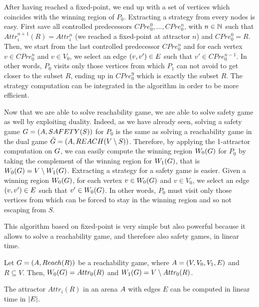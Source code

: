 After having reached a fixed-point, we end up with a set of vertices which coincides with the winning region of $P_0$. 
Extracting a strategy from every nodes is easy. 
First save all controlled predecessors $CPre_0^0,\dots,CPre_0^n$, with $n \in \mathbb{N}$ such that $Attr_i^{n+1}(R) = Attr_i^{n}$ (we reached a fixed-point at attractor $n$) and $CPre_0^0 = R$. Then, we start from the last controlled predecessor $CPre_0^n$ and for each vertex $v \in CPre_0^n$ and $ v \in V_0$, we select an edge $\left( v,v' \right) \in E$ such that $v' \in CPre_0^{n-1}$. 
In other words, $P_0$ visits only those vertices from which $P_1$ can not avoid to get closer to the subset $R$, ending up in $CPre_0^9$ which is exactly the subset $R$. 
The strategy computation can be integrated in the algorithm in order to be more efficient.

Now that we are able to solve reachability game, we are able to solve safety game as well by exploiting duality. 
Indeed, as we have already seen, solving a safety game $G = \left( A, SAFETY(S) \right)$ for $P_0$ is the same as solving a reachability game in the dual game $\bar{G} = \left( A, REACH(V \setminus S) \right)$. 
Therefore, by applying the 1-attractor computation on $G$, we can easily compute the winning region $W_0(G)$ for $P_0$ by taking the complement of the winning region for $W_1(G)$, that is $W_0(G) = V \setminus W_1(G)$.
Extracting a strategy for a safety game is easier.
Given a winning region $W_0(G)$, for each vertex $v \in W_0(G)$ and $v \in V_0$, we select an edge $\left( v,v' \right) \in E$ such that $v' \in W_0(G)$. In other words, $P_0$ must visit only those vertices from which can be forced to stay in the winning region and so not escaping from $S$.

This algorithm based on fixed-point is very simple but also powerful because it allows to solve a reachability game, and therefore also safety games, in linear time. 

\begin{lemma}
Let $G = (A, Reach(R))$ be a reachability game, where $A = \left( V, V_0, V_1, E \right)$ and $R \subseteq V$. Then, $W_0(G) = Attr_0(R)$ and $W_1(G) = V \setminus Attr_0(R)$.
\end{lemma}

\begin{lemma}
The attractor $Attr_i(R)$ in an arena $A$ with edges $E$ can be computed in linear time in $\left\lvert E \right\rvert$.
\end{lemma}



